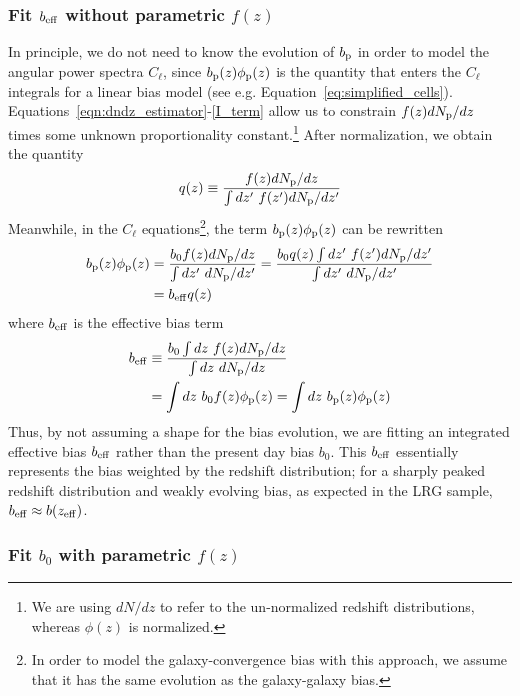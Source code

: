 \documentclass[a4paper,usenatbib]{mnras}
\begin{document}
\subsubsection{Fit $b_{\rm eff}$ without parametric $f(z)$}\label{sec:dndz_pipe/q}

In principle, we do not need to know the evolution of $b_{\rm p}$ in order to model the angular power spectra $C_{\ell}$, since $b_{\rm p}(z)\phi_{\rm p}(z)$ is the quantity that enters the $C_{\ell}$ integrals for a linear bias model (see e.g. Equation~\ref{eq:simplified_cells}). Equations~\ref{eqn:dndz_estimator}-\ref{I_term} allow us to constrain $f(z)dN_{\rm p}/dz$ times some unknown proportionality constant.\footnote{We are using $dN/dz$ to refer to the un-normalized redshift distributions, whereas $\phi(z)$ is normalized.} After normalization, we obtain the quantity
%
\begin{equation}
q(z) \equiv \frac{f(z)dN_{\rm p}/dz}{\int dz^{\prime} \ f(z^{\prime})dN_{\rm p}/dz^{\prime}}
\end{equation}
%
Meanwhile, in the $C_{\ell}$ equations\footnote{In order to model the galaxy-convergence bias with this approach, we assume that it has the same evolution as the galaxy-galaxy bias.}, the term $b_{\rm p}(z)\phi_{\rm p}(z)$ can be rewritten 
%
\begin{align}
    b_{\rm p}(z)\phi_{\rm p}(z) &= \frac{b_0 f(z) dN_{\rm p}/dz}{\int dz^{\prime} \ dN_{\rm p}/dz^{\prime}} = \frac{b_0 q(z) \int dz^{\prime} \ f(z^{\prime})dN_{\rm p}/dz^{\prime}}{\int dz^{\prime} \ dN_{\rm p}/dz^{\prime}} \\
    &= b_{\rm eff}q(z)
\end{align}
%
where $b_{\rm eff}$ is the effective bias term
\begin{align}
    b_{\rm eff} &\equiv \frac{b_0\int dz \ f(z)dN_{\rm p}/dz}{\int dz \  dN_{\rm p}/dz} \\
    &= \int dz \ b_0 f(z) \phi_{\rm p}(z) = \int dz \ b_{\rm p}(z) \phi_{\rm p}(z)
\end{align}
Thus, by not assuming a shape for the bias evolution, we are fitting an integrated effective bias $b_{\rm eff}$ rather than the present day bias $b_0$. This $b_{\rm eff}$ essentially represents the bias weighted by the redshift distribution; for a sharply peaked redshift distribution and weakly evolving bias, as expected in the LRG sample, $b_{\rm eff} \approx b(z_{\rm eff})$.

\subsubsection{Fit $b_0$ with parametric $f(z)$}
\end{document}
